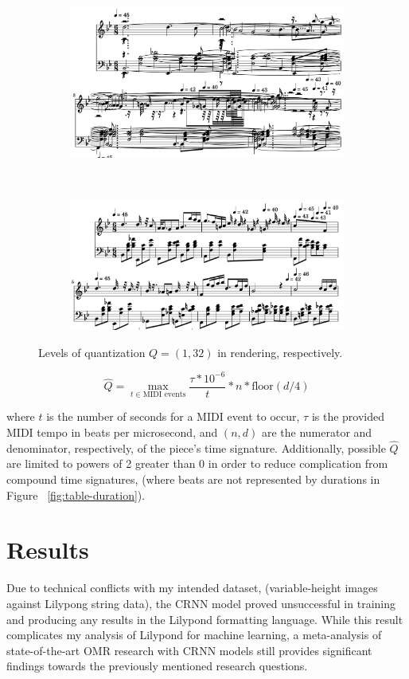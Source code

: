 \documentclass[nonacm, sigconf]{acmart}
\begin{document}
\begin{figure}
	\centering
	\begin{subfigure}
		\centering
		\includegraphics[width = .8\linewidth]{./figures/c1.png}
	\end{subfigure}
	~
	\begin{subfigure}
		\centering
		\includegraphics[width = .8\linewidth]{./figures/c32.png}
	\end{subfigure}
	\caption{Levels of quantization $Q = (1, 32)$ in rendering, respectively.}
	\label{fig:quantization}
\end{figure}

\begin{equation}
	\hat Q = \max_{t\in \text{MIDI events}} \frac{\tau * 10^{-6}}{t} * n * \text{floor}(d / 4)
\end{equation}

where $t$ is the number of seconds for a MIDI event to occur, $\tau$ is the provided MIDI tempo in beats per microsecond, and $(n, d)$ are the numerator and denominator, respectively, of the piece's time signature.
Additionally, possible $\hat Q$ are limited to powers of 2 greater than 0 in order to reduce complication from compound time signatures, (where beats are not represented by durations in Figure ~\ref{fig:table-duration}).


\section{Results}
Due to technical conflicts with my intended dataset, (variable-height images against Lilypong string data),
 the CRNN model proved unsuccessful in training and producing any results in the Lilypond formatting language.
While this result complicates my analysis of Lilypond for machine learning, a meta-analysis of state-of-the-art OMR research with CRNN models still provides significant findings towards the previously mentioned research questions.  
\end{document}
